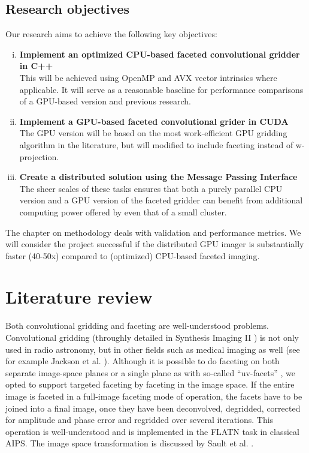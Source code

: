 \documentclass[a4paper, two column]{article}
\begin{document}
\subsection{Research objectives}
Our research aims to achieve the following key objectives:
\begin{enumerate}[i)]
 \item \textbf{Implement an optimized CPU-based faceted convolutional gridder in C++}\\
  This will be achieved using OpenMP and AVX vector intrinsics where applicable. It will serve as a reasonable baseline for performance comparisons of a GPU-based version and previous research.
 \item \textbf{Implement a GPU-based faceted convolutional grider in CUDA}\\
  The GPU version will be based on the most work-efficient GPU gridding algorithm in the literature, but will modified to include faceting instead of w-projection.
 \item \textbf{Create a distributed solution using the Message Passing Interface}\\
  The sheer scales of these tasks ensures that both a purely parallel CPU version and a GPU version of the faceted gridder can benefit from additional computing power offered by even that of a small cluster.
\end{enumerate}

The chapter on methodology deals with validation and performance metrics. We will consider the project successful if the distributed GPU imager is substantially faster (40-50x) compared to (optimized) CPU-based 
faceted imaging.
\section{Literature review}
 Both convolutional gridding and faceting are well-understood problems. Convolutional gridding (throughly detailed in Synthesis Imaging II \cite{taylor1999synthesis}) is not only used in radio astronomy, but in other fields such as 
 medical imaging as well (see for example Jackson et al. \cite{jackson1991selection}). Although it is possible to do faceting on both separate image-space planes \cite{cornwell1992radio} or a single plane as with so-called ``uv-facets'' \cite{AIPS113}, we opted to support targeted 
 faceting by faceting in the image space. If the entire image is faceted in a full-image faceting mode of operation, the facets have to be joined into a final image, once they have been deconvolved, degridded, corrected for amplitude and phase error and regridded over several iterations. 
 This operation is well-understood and is implemented in the FLATN task in classical AIPS. The image space transformation is discussed by Sault et al. \cite{sault1996approach}.
 
\end{document}
